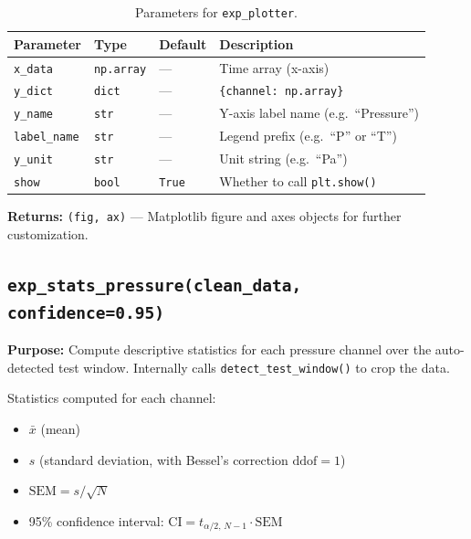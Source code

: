 \documentclass[11pt, letterpaper]{article}
\begin{document}
\begin{table}[h!]
\centering
\caption{Parameters for \texttt{exp\_plotter}.}
\begin{tabular}{@{}llll@{}}
\toprule
\textbf{Parameter} & \textbf{Type} & \textbf{Default} & \textbf{Description} \\
\midrule
\texttt{x\_data}     & \texttt{np.array} & ---          & Time array (x-axis) \\
\texttt{y\_dict}     & \texttt{dict}     & ---          & \texttt{\{channel: np.array\}} \\
\texttt{y\_name}     & \texttt{str}      & ---          & Y-axis label name (e.g.\ ``Pressure'') \\
\texttt{label\_name} & \texttt{str}      & ---          & Legend prefix (e.g.\ ``P'' or ``T'') \\
\texttt{y\_unit}     & \texttt{str}      & ---          & Unit string (e.g.\ ``Pa'') \\
\texttt{show}        & \texttt{bool}     & \texttt{True} & Whether to call \texttt{plt.show()} \\
\bottomrule
\end{tabular}
\end{table}

\textbf{Returns:} \texttt{(fig, ax)} --- Matplotlib figure and axes
objects for further customization.

\subsection{\texttt{exp\_stats\_pressure(clean\_data, confidence=0.95)}}
\label{subsec:exp_stats_pressure}

\textbf{Purpose:} Compute descriptive statistics for each pressure
channel over the auto-detected test window. Internally calls
\texttt{detect\_test\_window()} to crop the data.

Statistics computed for each channel:

\begin{itemize}[nosep]
    \item $\bar{x}$ (mean)
    \item $s$ (standard deviation, with Bessel's correction $\text{ddof}=1$)
    \item $\text{SEM} = s / \sqrt{N}$
    \item 95\% confidence interval: $\text{CI} = t_{\alpha/2,\,N-1}
          \cdot \text{SEM}$
\end{itemize}
\end{document}
